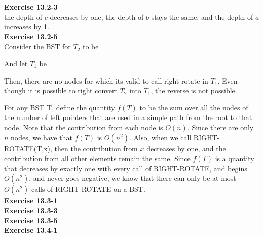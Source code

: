 \documentclass{article}
\begin{document}
\noindent\textbf{ Exercise 13.2-3} \\
the depth of $c$ decreases by one, the depth of $b$ stays the same, and the depth of $a$ increases by 1.\\


\noindent\textbf{ Exercise 13.2-5} \\
Consider the BST for $T_2$ to be


And let $T_1$ be 


Then, there are no nodes for which its valid to call right rotate in $T_1$. Even though it is possible to right convert $T_2$ into $T_1$, the reverse is not possible.


For any BST T, define the quantity $f(T)$ to be the sum over all the nodes of the number of left pointers that are used in a simple path from the root to that node. Note that the contribution from each node is $O(n)$. Since there are only $n$ nodes, we have that $f(T)$ is $O(n^2)$. Also, when we call RIGHT-ROTATE(T,x), then the contribution from $x$ decreases by one, and the contribution from all other elements remain the same. Since $f(T)$ is a quantity that decreases by exactly one with every call of RIGHT-ROTATE, and begins $O(n^2)$, and never goes negative, we know that there can only be at most $O(n^2)$ calls of RIGHT-ROTATE on a BST.\\



\noindent\textbf{ Exercise 13.3-1} \\



\noindent\textbf{ Exercise 13.3-3} \\
\noindent\textbf{ Exercise 13.3-5} \\
\noindent\textbf{ Exercise 13.4-1} \\
\end{document}
